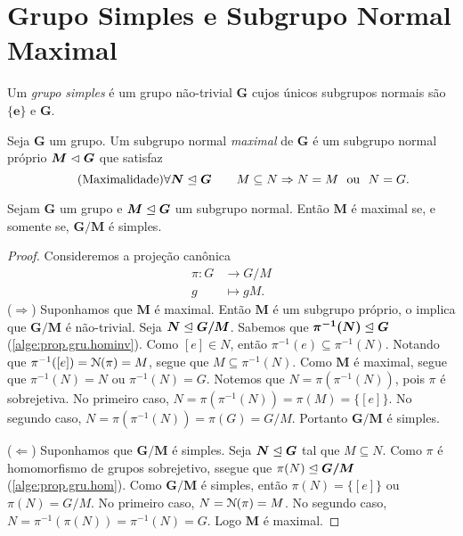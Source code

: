 \section{Grupo Simples e Subgrupo Normal Maximal}

\begin{defi}
Um \emph{grupo simples} é um grupo não-trivial $\bm G$ cujos únicos subgrupos normais são $\bm{\{e\}}$ e $\bm G$.
\end{defi}

\begin{defi}
Seja $\bm G$ um grupo. Um subgrupo normal \emph{maximal} de $\bm G$ é um subgrupo normal próprio $\bm M \mathrel{\lhd} \bm G$ que satisfaz
	\begin{equation*}
	\tag{Maximalidade} \forall \bm N \mathrel{\unlhd} \bm G \qquad M \subseteq N \Rightarrow N = M \text{\ \ ou\ \ } N = G.
	\end{equation*}
\end{defi}

\begin{prop}
Sejam $\bm G$ um grupo e $\bm M \mathrel{\unlhd} \bm G$ um subgrupo normal. Então $\bm M$ é maximal se, e somente se, $\bm{G/M}$ é simples.
\end{prop}
\begin{proof} Consideremos a projeção canônica
	\begin{align*}
	\pi: G &\to G/M \\
		 g &\mapsto gM.
	\end{align*}
($\Rightarrow$) Suponhamos que $\bm M$ é maximal. Então $\bm M$ é um subgrupo próprio, o implica que $\bm{G/M}$ é não-trivial. Seja $\bm N \mathrel{\unlhd} \bm{G/M}$. Sabemos que $\bm{\pi^{-1}(N)} \mathrel{\unlhd} \bm G$ (\ref{alge:prop.gru.hominv}). Como $[e] \in N$, então $\pi^{-1}(e) \subseteq \pi^{-1}(N)$. Notando que $\pi^{-1}([e])=\mathcal{N}(\pi) = M$, segue que $M \subseteq \pi^{-1}(N)$. Como $\bm M$ é maximal, segue que $\pi^{-1}(N) = N$ ou $\pi^{-1}(N) = G$. Notemos que $N=\pi(\pi^{-1}(N))$, pois $\pi$ é sobrejetiva. No primeiro caso, $N = \pi(\pi^{-1}(N)) = \pi(M) = \{[e]\}$. No segundo caso, $N = \pi(\pi^{-1}(N)) = \pi(G) = G/M$. Portanto $\bm{G/M}$ é simples.

\noindent
($\Leftarrow$) Suponhamos que $\bm{G/M}$ é simples. Seja $\bm N \mathrel{\unlhd} \bm G$ tal que $M \subseteq N$. Como $\pi$ é homomorfismo de grupos sobrejetivo, ssegue que $\pi(N) \mathrel{\unlhd} \bm{G/M}$ (\ref{alge:prop.gru.hom}). Como $\bm{G/M}$ é simples, então $\pi(N) = \{[e]\}$ ou $\pi(N) = G/M$. No primeiro caso, $N = \mathcal{N}(\pi) = M$. No segundo caso, $N = \pi^{-1}(\pi(N)) = \pi^{-1}(N) = G$. Logo $\bm M$ é maximal.
\end{proof}

